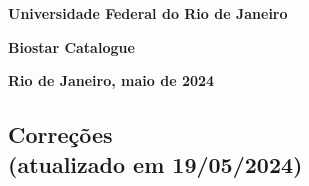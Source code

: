 \documentclass{article}
\begin{document}
		\begin{titlepage}
		\begin{center}
			{\large \textbf{Universidade Federal do Rio de Janeiro}}

			\vspace{9cm}	
			
			{\Large \textbf{Biostar Catalogue}}\\
			
			\vspace{9cm}
			
			\textbf{Rio de Janeiro, maio de 2024}
		\end{center}	
	\end{titlepage}
	
	\begin{center}
	\section*{\small Correções \\ (atualizado em 19/05/2024)}
	\end{center}
	\vspace{50pt}
	
\end{document}
